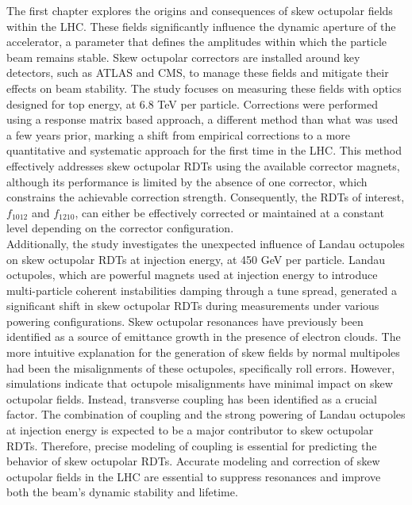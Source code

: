 {%
The first chapter explores the origins and consequences of skew octupolar fields within the LHC.
These fields significantly influence the dynamic aperture of the accelerator, a parameter
that defines the amplitudes within which the particle beam remains stable. Skew octupolar correctors
are installed around key detectors, such as ATLAS and CMS, to manage these fields and mitigate their
effects on beam stability. The study focuses on measuring these fields with optics designed for top
energy, at 6.8 TeV per particle. Corrections were performed using a response matrix based approach,
a different method than what was used a few years prior, marking a shift from empirical corrections
to a more quantitative and systematic approach for the first time in the LHC. 
This method effectively addresses skew octupolar RDTs using the available corrector magnets,
although its performance is limited by the absence of one corrector, which constrains the achievable
correction strength. Consequently, the RDTs of interest, $f_{1012}$ and $f_{1210}$, can either be
effectively corrected or maintained at a constant level depending on the corrector configuration.
\\
\indent
Additionally, the study investigates the unexpected influence of Landau octupoles on skew octupolar
RDTs at injection energy, at 450 GeV per particle. Landau octupoles, which are powerful magnets used
at injection energy to introduce multi-particle coherent instabilities damping through a tune
spread, generated a significant shift in skew octupolar RDTs during measurements under various
powering configurations. Skew octupolar resonances have previously been identified as a source of
emittance growth in the presence of electron clouds. The more intuitive explanation for the
generation of skew fields by normal multipoles had been the misalignments of these octupoles,
specifically roll errors. However, simulations indicate that octupole misalignments have minimal
impact on skew octupolar fields. Instead, transverse coupling has been identified as a crucial
factor. The combination of coupling and the strong powering of Landau octupoles at injection energy
is expected to be a major contributor to skew octupolar RDTs. Therefore, precise modeling of
coupling is essential for predicting the behavior of skew octupolar RDTs. Accurate modeling and
correction of skew octupolar fields in the LHC are essential to suppress resonances and improve both
the beam's dynamic stability and lifetime.


}
